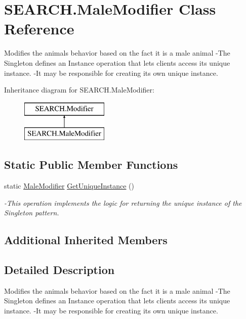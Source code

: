 \hypertarget{class_s_e_a_r_c_h_1_1_male_modifier}{\section{S\-E\-A\-R\-C\-H.\-Male\-Modifier Class Reference}
\label{class_s_e_a_r_c_h_1_1_male_modifier}
}


Modifies the animals behavior based on the fact it is a male animal -\/\-The Singleton defines an Instance operation that lets clients access its unique instance. -\/\-It may be responsible for creating its own unique instance.  


Inheritance diagram for S\-E\-A\-R\-C\-H.\-Male\-Modifier\-:\begin{figure}[H]
\begin{center}
\leavevmode
\includegraphics[height=2.000000cm]{class_s_e_a_r_c_h_1_1_male_modifier}
\end{center}
\end{figure}
\subsection*{Static Public Member Functions}
\begin{DoxyCompactItemize}
\item 
static \hyperlink{class_s_e_a_r_c_h_1_1_male_modifier}{Male\-Modifier} \hyperlink{class_s_e_a_r_c_h_1_1_male_modifier_a321255c5bdf156ecf49a594818d66038}{Get\-Unique\-Instance} ()
\begin{DoxyCompactList}\small\item\em -\/\-This operation implements the logic for returning the unique instance of the Singleton pattern. \end{DoxyCompactList}\end{DoxyCompactItemize}
\subsection*{Additional Inherited Members}


\subsection{Detailed Description}
Modifies the animals behavior based on the fact it is a male animal -\/\-The Singleton defines an Instance operation that lets clients access its unique instance. -\/\-It may be responsible for creating its own unique instance. 



